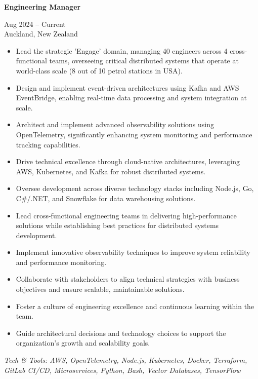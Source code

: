 \documentclass[10pt,a4paper,ragged2e,withhyper]{altacv}
\renewcommand{\cvevent}[4]{%
  \textbf{#1} %
  \hfill %
  \begin{minipage}[t]{.5\linewidth}
    \raggedleft %
    \small#3 %
    \\ %
    #4 %
  \end{minipage}
  \vspace{\baselineskip} %
}
\begin{document}



\cvevent{Engineering Manager}{Invenco by GVR}{Aug 2024 -- Current}{Auckland, New Zealand}

\begin{itemize}
\item Lead the strategic 'Engage' domain, managing 40 engineers across 4 cross-functional teams, overseeing critical distributed systems that operate at world-class scale (8 out of 10 petrol stations in USA).
\item Design and implement event-driven architectures using Kafka and AWS EventBridge, enabling real-time data processing and system integration at scale.
\item Architect and implement advanced observability solutions using OpenTelemetry, significantly enhancing system monitoring and performance tracking capabilities.
\item Drive technical excellence through cloud-native architectures, leveraging AWS, Kubernetes, and Kafka for robust distributed systems.
\item Oversee development across diverse technology stacks including Node.js, Go, C\#/.NET, and Snowflake for data warehousing solutions.
\item Lead cross-functional engineering teams in delivering high-performance solutions while establishing best practices for distributed systems development.
\item Implement innovative observability techniques to improve system reliability and performance monitoring.
\item Collaborate with stakeholders to align technical strategies with business objectives and ensure scalable, maintainable solutions.
\item Foster a culture of engineering excellence and continuous learning within the team.
\item Guide architectural decisions and technology choices to support the organization's growth and scalability goals.
\end{itemize}

\vspace{0.5cm}

\textit{Tech \& Tools: AWS, OpenTelemetry, Node.js, Kubernetes, Docker, Terraform, GitLab CI/CD, Microservices, Python, Bash, Vector Databases, TensorFlow}

\divider
\end{document}
